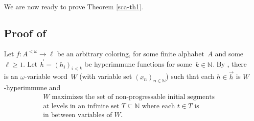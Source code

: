 \documentclass{article}
\newcommand{\NN}[0]{\mathbb{N}}
\numberwithin{theorem}{section}
\theoremstyle{definition}
\begin{document}
We are now ready to prove Theorem \ref{sca-th1}.

\subsection{Proof of }

Let $f : A^{<\omega} \to \ell$ be an arbitrary coloring, for some finite alphabet~$A$ and some~$\ell \geq 1$.
Let $\vec{h} = (h_i)_{i < k}$ be hyperimmune functions for some~$k \in \NN$.
By , there is an $\omega$-variable word~$W$ (with variable set $(x_n)_{n \in \NN}$) such that 
each $h\in\vec{h}$ is $W$-hyperimmune and
\begin{align}\label{scaOVW-eqmaximalnonprogressable}
&\text{$W$  maximizes the set of non-progressable initial segments }\\ \nonumber
&\text{at levels
in an infinite set $T\subseteq\NN$ where each $t\in T $  is}\\ \nonumber
&\text{in between variables of $W$.}
\end{align}
\end{document}
